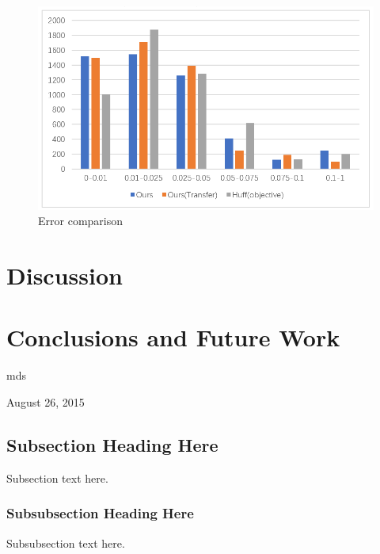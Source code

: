\documentclass[journal,transmag]{IEEEtran}
\begin{document}
\begin{figure}[tb]
\centering
\includegraphics[width=1\columnwidth]{figure12.png}
\caption{Error comparison}
\label{fig:Error-comparison}
\end{figure}



\section{Discussion}





\section{Conclusions and Future Work}




\hfill mds
 
\hfill August 26, 2015

\subsection{Subsection Heading Here}
Subsection text here.


\subsubsection{Subsubsection Heading Here}
Subsubsection text here.
\end{document}
